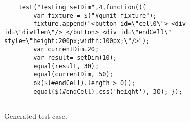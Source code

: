 \begin{figure}
\begin{lstlisting}
	test("Testing setDim",4,function(){
		var fixture = $("#qunit-fixture");
		fixture.append("<button id=\"cell0\"> <div id=\"divElem\"/> </button> <div id=\"endCell\" style=\"height:200px;width:100px;\"/>");
		var currentDim=20;
		var result= setDim(10);
		equal(result, 30);
		equal(currentDim, 50);
		ok($(#endCell).length > 0));
		equal($(#endCell).css('height'), 30); });
	
\end{lstlisting}
\vspace{-0.1in} 

\caption{Generated \qunit test case.}
\label{Fig:qunitTestSample}

\end{figure}